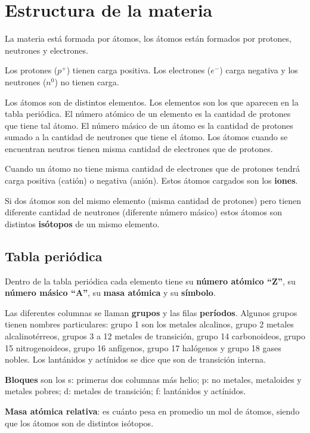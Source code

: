 \section{Estructura de la materia}

La materia está formada por átomos, los átomos están formados por protones, neutrones y electrones.

\sskip
Los protones ($p^+$) tienen carga positiva. Los electrones ($e^-$) carga negativa y los neutrones ($n^0$) no tienen carga.

\sskip
Los átomos son de distintos elementos. Los elementos son los que aparecen en la tabla periódica. El número atómico de un elemento es la cantidad de protones que tiene tal átomo. El número másico de un átomo es la cantidad de protones sumado a la cantidad de neutrones que tiene el átomo. Los átomos cuando se encuentran neutros tienen misma cantidad de electrones que de protones.

\sskip
Cuando un átomo no tiene misma cantidad de electrones que de protones tendrá carga positiva (catión) o negativa (anión). Estos átomos cargados son los \textbf{iones}.

\sskip
Si dos átomos son del mismo elemento (misma cantidad de protones) pero tienen diferente cantidad de neutrones (diferente número másico) estos átomos son distintos \textbf{isótopos} de un mismo elemento.



\subsection*{Tabla periódica}

Dentro de la tabla periódica cada elemento tiene su \textbf{número atómico ``Z''}, su \textbf{número másico ``A''}, su \textbf{masa atómica} y su \textbf{símbolo}. 

\sskip
Las diferentes columnas se llaman \textbf{grupos} y las filas \textbf{períodos}.
Algunos grupos tienen nombres particulares: grupo 1 son los metales alcalinos, grupo 2 metales alcalinotérreos, grupos 3 a 12 metales de transición, grupo 14 carbonoideos, grupo 15 nitrogenoideos, grupo 16 anfígenos,  grupo 17 halógenos y grupo 18 gases nobles. Los lantánidos y actínidos se dice que son de transición interna.

\sskip
\textbf{Bloques} son los s: primeras dos columnas más helio; p: no metales, metaloides y metales pobres; d: metales de transición; f: lantánidos y actínidos.

\sskip
\textbf{Masa atómica relativa}: es cuánto pesa en promedio un mol de átomos, siendo que los átomos son de distintos isótopos.


